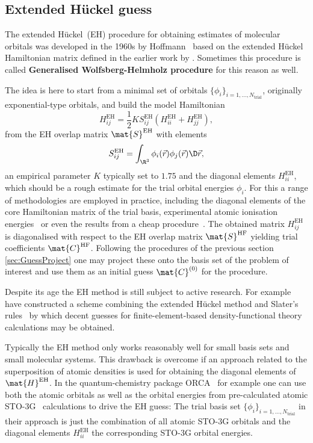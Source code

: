 \subsection{Extended Hückel guess}
The extended Hückel~(EH) procedure for obtaining estimates
of molecular orbitals was developed in the 1960s
by Hoffmann~\cite{Hoffmann1963}
based on the extended Hückel Hamiltonian matrix defined
in the earlier work by \citet{Wolfsberg1952}.
Sometimes this procedure is called
\textbf{Generalised Wolfsberg-Helmholz procedure}
for this reason as well.

The idea is here to start from a minimal set of orbitals
$\{\phi_i\}_{i=1,\ldots,N_\text{trial}}$,
originally exponential-type orbitals,
and build the model Hamiltonian
\[
	H_{ij}^\text{EH}
		= \frac12 K S^\text{EH}_{ij} \left( H_{ii}^\text{EH} + H_{jj}^\text{EH} \right),
\]
from the EH overlap matrix $\mat{S}^\text{EH}$ with elements
\[ S^\text{EH}_{ij} = \int_{\R^3} \phi_i(\vec{r}) \phi_j(\vec{r}) \D\vec{r}, \]
an empirical parameter $K$ typically set to $1.75$
and the diagonal elements $H_{ii}^\text{EH}$,
which should be a rough estimate for the trial orbital energies $\phi_i$.
For this a range of methodologies are employed in practice,
including the diagonal elements of the core Hamiltonian matrix
of the trial basis,
experimental atomic ionisation energies~\cite{Yamehmop}
or even the results from a cheap \SCF procedure~\cite{ORCA}.
The obtained matrix $H_{ij}^\text{EH}$ is diagonalised with respect
to the EH overlap matrix $\mat{S}^\text{HF}$
yielding trial coefficients $\mat{C}^\text{HF}$.
Following the procedures of the previous section \ref{sec:GuessProject}
one may project these onto the basis set of the problem of interest
and use them as an initial guess $\mat{C}^{(0)}$ for the \SCF procedure.

Despite its age the EH method is still subject to active research.
For example \citet{Lee2015} have constructed a scheme combining
the extended Hückel method and Slater's rules~\cite{Slater1930}
by which decent guesses for finite-element-based density-functional theory
calculations may be obtained.

Typically the EH method only works reasonably well
for small basis sets and small molecular systems.
This drawback is overcome if an approach related to the
superposition of atomic densities is used for obtaining the diagonal
elements of $\mat{H}^\text{EH}$.
In the quantum-chemistry package ORCA~\cite{ORCA} for example
one can use both the atomic orbitals as well as the orbital energies
from pre-calculated atomic STO-3G~\cite{Hehre1969} calculations
to drive the EH guess:
The trial basis set $\{\phi_i\}_{i=1,\ldots,N_\text{trial}}$
in their approach is just the combination of all atomic STO-3G orbitals
and the diagonal elements $H_{ii}^\text{EH}$ the corresponding STO-3G orbital energies.


